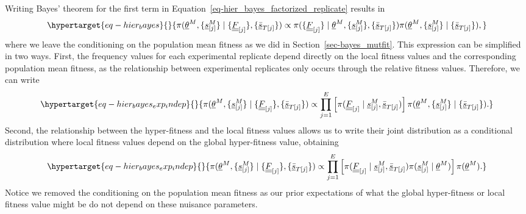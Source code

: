\documentclass[
  letterpaper,
  DIV=11,
  numbers=noendperiod]{scrartcl}
\begin{document}
\begin{refsegment}
Writing Bayes' theorem for the first term in
Equation~\ref{eq-hier_bayes_factorized_replicate} results in
\begin{equation}\protect\hypertarget{eq-hier_bayes}{}{
\pi(
    \underline{\theta}^M, 
    \{\underline{s}^M_{[j]}\} \mid
    \{\underline{\underline{F}}_{[j]}\},
    \{\underline{\bar{s}}_{T[j]}\}
) \propto
\pi(
    \{\underline{\underline{F}}_{[j]}\} \mid
    \underline{\theta}^M, 
    \{\underline{s}^M_{[j]}\},
    \{\underline{\bar{s}}_{T[j]}\}
)
\pi(
    \underline{\theta}^M, 
    \{\underline{s}^M_{[j]}\} \mid
    \{\underline{\bar{s}}_{T[j]}\}
),
}\label{eq-hier_bayes}\end{equation} where we leave the conditioning on
the population mean fitness as we did in Section~\ref{sec-bayes_mutfit}.
This expression can be simplified in two ways. First, the frequency
values for each experimental replicate depend directly on the local
fitness values and the corresponding population mean fitness, as the
relationship between experimental replicates only occurs through the
relative fitness values. Therefore, we can write
\begin{equation}\protect\hypertarget{eq-hier_bayes_exp_indep}{}{
\pi(
    \underline{\theta}^M, 
    \{\underline{s}^M_{[j]}\} \mid
    \{\underline{\underline{F}}_{[j]}\},
    \{\underline{\bar{s}}_{T[j]}\}
) \propto
\prod_{j=1}^E\left[
    \pi(
        \underline{\underline{F}}_{[j]} \mid
        \underline{s}^M_{[j]},
        \underline{\bar{s}}_{T[j]}
    )
\right]
\pi(
    \underline{\theta}^M, 
    \{\underline{s}^M_{[j]}\} \mid
    \{\underline{\bar{s}}_{T[j]}\}
).
}\label{eq-hier_bayes_exp_indep}\end{equation} Second, the relationship
between the hyper-fitness and the local fitness values allows us to
write their joint distribution as a conditional distribution where local
fitness values depend on the global hyper-fitness value, obtaining
\begin{equation}\protect\hypertarget{eq-hier_bayes_exp_indep}{}{
\pi(
    \underline{\theta}^M, 
    \{\underline{s}^M_{[j]}\} \mid
    \{\underline{\underline{F}}_{[j]}\},
    \{\underline{\bar{s}}_{T[j]}\}
) \propto
\prod_{j=1}^E\left[
    \pi(
        \underline{\underline{F}}_{[j]} \mid
        \underline{s}^M_{[j]},
        \underline{\bar{s}}_{T[j]}
    )
    \pi(
        \underline{s}^M_{[j]} \mid
        \underline{\theta}^M
    )
\right] 
\pi(
    \underline{\theta}^M
).
}\label{eq-hier_bayes_exp_indep}\end{equation} Notice we removed the
conditioning on the population mean fitness as our prior expectations of
what the global hyper-fitness or local fitness value might be do not
depend on these nuisance parameters.


\end{refsegment}
\end{document}

